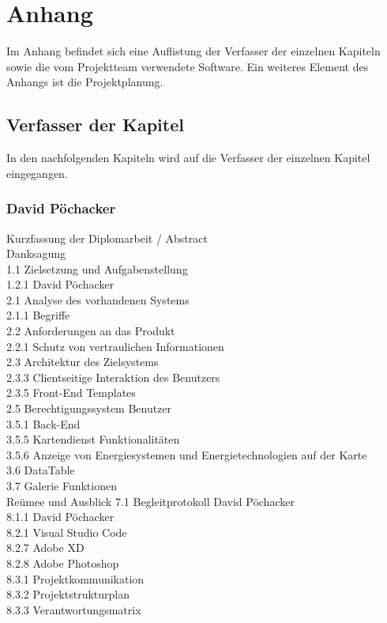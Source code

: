 \chapter{Anhang}
Im Anhang befindet sich eine Auflistung der Verfasser der einzelnen Kapiteln sowie die vom Projektteam verwendete Software. Ein weiteres Element des Anhangs ist die Projektplanung.

\section{Verfasser der Kapitel}
In den nachfolgenden Kapiteln wird auf die Verfasser der einzelnen Kapitel eingegangen.
\subsection{David Pöchacker}
Kurzfassung der Diplomarbeit / Abstract \\
Danksagung \\
1.1 Zielsetzung und Aufgabenstellung  \\
1.2.1 David Pöchacker \\
2.1 Analyse des vorhandenen Systems 	 \\
2.1.1 Begriffe \\
2.2 Anforderungen an das Produkt	 \\
2.2.1 Schutz von vertraulichen Informationen  \\
2.3 Architektur des Zielsystems  \\
2.3.3 Clientseitige Interaktion des Benutzers  \\
2.3.5  Front-End Templates  \\
2.5 Berechtigungssystem Benutzer  \\
3.5.1 Back-End  \\
3.5.5  Kartendienst Funktionalitäten  \\
3.5.6  Anzeige von Energiesystemen und Energietechnologien auf der Karte  \\
3.6 DataTable  \\
3.7 Galerie Funktionen  \\
Reümee und Ausblick
7.1 Begleitprotokoll David Pöchacker	 \\
8.1.1 David Pöchacker \\
8.2.1 Visual Studio Code  \\
8.2.7 Adobe XD  \\
8.2.8 Adobe Photoshop  \\
8.3.1 Projektkommunikation \\
8.3.2 Projektstrukturplan\\
8.3.3 Verantwortungsmatrix\\

